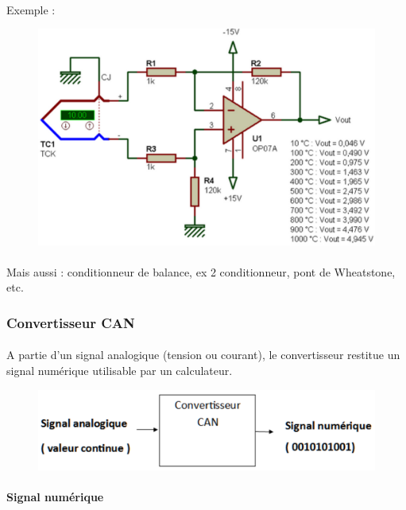 \documentclass{article}
\begin{document}
\paragraph{}
Exemple :
\begin{figure}[H]
    \centering
    \includegraphics[width=0.9\linewidth]{images/ex-conditionneur.png}    
\end{figure}

\paragraph{}
Mais aussi : conditionneur de balance, ex 2 conditionneur, pont de Wheatstone, etc.

\subsubsection{Convertisseur CAN}
\paragraph{}
A partie d'un signal analogique (tension ou courant), le convertisseur restitue un signal numérique utilisable par un calculateur.

\begin{figure}[H]
    \centering
    \includegraphics[width=0.6\linewidth]{images/CAN.png}    
\end{figure}

\paragraph{Signal numérique}
\end{document}
